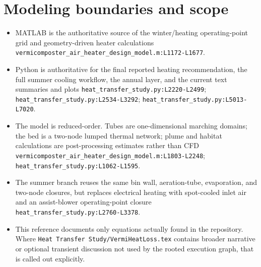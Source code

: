 \documentclass[11pt]{article}
\newcommand{\srcref}[1]{\nolinkurl{#1}}
\newcommand{\filepath}[1]{\nolinkurl{#1}}
\begin{document}
\section{Modeling boundaries and scope}
\begin{itemize}[leftmargin=*]
\item MATLAB is the authoritative source of the winter/heating operating-point grid and geometry-driven heater calculations \srcref{vermicomposter_air_heater_design_model.m:L1172-L1677}.
\item Python is authoritative for the final reported heating recommendation, the full summer cooling workflow, the annual layer, and the current text summaries and plots \srcref{heat_transfer_study.py:L2220-L2499}; \srcref{heat_transfer_study.py:L2534-L3292}; \srcref{heat_transfer_study.py:L5013-L7020}.
\item The model is reduced-order. Tubes are one-dimensional marching domains; the bed is a two-node lumped thermal network; plume and habitat calculations are post-processing estimates rather than CFD \srcref{vermicomposter_air_heater_design_model.m:L1803-L2248}; \srcref{heat_transfer_study.py:L1062-L1595}.
\item The summer branch reuses the same bin wall, aeration-tube, evaporation, and two-node closures, but replaces electrical heating with spot-cooled inlet air and an assist-blower operating-point closure \srcref{heat_transfer_study.py:L2760-L3378}.
\item This reference documents only equations actually found in the repository. Where \filepath{Heat Transfer Study/VermiHeatLoss.tex} contains broader narrative or optional transient discussion not used by the rooted execution graph, that is called out explicitly.
\end{itemize}
\end{document}
